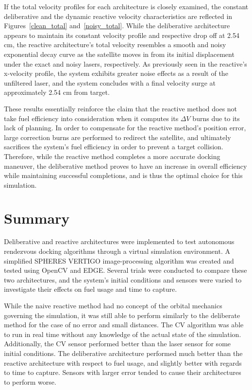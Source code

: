 \documentclass[journal, 10pt]{IEEEtran}
\begin{document}
If the total velocity profiles for each architecture is closely examined, the constant deliberative and the dynamic reactive velocity characteristics are reflected in Figures~\ref{clean_total} and~\ref{noisy_total}. While the deliberative architecture appears to maintain its constant velocity profile and respective drop off at 2.54 cm, the reactive architecture's total velocity resembles a smooth and noisy exponential decay curve as the satellite moves in from its initial displacement under the exact and noisy lasers, respectively. As previously seen in the reactive's x-velocity profile, the system exhibits greater noise effects as a result of the unfiltered laser, and the system concludes with a final velocity surge at approximately 2.54 cm from target.

These results essentially reinforce the claim that the reactive method does not take fuel efficiency into consideration when it computes its $\Delta V$  burns due to its lack of planning. In order to compensate for the reactive method's position error, large correction burns are performed to redirect the satellite, and ultimately sacrifices the system's fuel efficiency in order to prevent a target collision. Therefore, while the reactive method completes a more accurate docking maneuver, the deliberative method proves to have an increase in overall efficiency while maintaining successful completions, and is thus the optimal choice for this simulation.

\section{Summary}
Deliberative and reactive architectures were implemented to test autonomous rendezvous docking algorithms through a virtual simulation environment. A simplified SPHERES VERTIGO image-processing algorithm was created and tested using OpenCV and EDGE. Several trials were conducted to compare these two architectures, and the system's initial conditions and sensors were varied to investigate their effects on fuel usage and time to capture.

While the naive reactive method had no concept of the orbital mechanics governing the simulation, it was still able to perform similarly to the deliberate method for the case of no error and small distances. The CV algorithm was able to run in real time without any knowledge of the actual state of the simulation. Additionally, the CV sensor performed better than the laser sensor for some initial conditions. The deliberative architecture performed much better than the reactive architecture with respect to fuel usage, and slightly better with regards to time to capture. Sensors with larger error tended to cause their architectures to perform worse.
\end{document}
